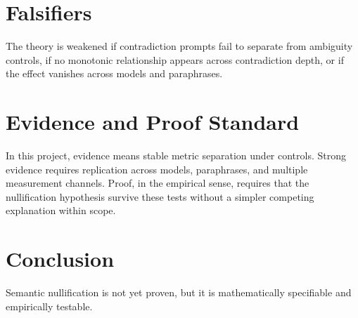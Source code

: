 \documentclass[11pt]{article}
\begin{document}
\section{Falsifiers}
The theory is weakened if contradiction prompts fail to separate from ambiguity controls, if no monotonic relationship appears across contradiction depth, or if the effect vanishes across models and paraphrases.

\section{Evidence and Proof Standard}
In this project, evidence means stable metric separation under controls. Strong evidence requires replication across models, paraphrases, and multiple measurement channels. Proof, in the empirical sense, requires that the nullification hypothesis survive these tests without a simpler competing explanation within scope.

\section{Conclusion}
Semantic nullification is not yet proven, but it is mathematically specifiable and empirically testable.

\nocite{*}


\end{document}
